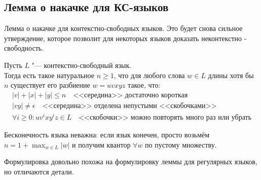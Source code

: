 
\subsection{Лемма о накачке для КС-языков}
Лемма о накачке для контекстно-свободных языков. Это будет снова сильное утверждение, которое позволит для некоторых языков
доказать неконтекстно - свободность.

\begin{lemma}
    Пусть $L$ "--- контекстно-свободный язык.\\
    Тогда есть такое натуральное $n \ge 1$, 
    что для любого слова $w \in L$ длины хотя бы $n$
    существует его разбиение $w=uvxyz$ такое, что:
    \begin{gather*}
        |v| + |x| + |y| \le n \quad \text{<<середина>> достаточно короткая}\\
        |vy| \neq \epsilon \quad \text{<<середина>> отделена непустыми <<скобочками>>}\\
        \forall i \ge 0 \colon uv^ixy^iz \in L \quad \text{<<скобочки>> можно повторять много раз или убрать}
    \end{gather*}
\end{lemma}
\begin{Rem}
    Бесконечность языка неважна: если язык конечен, просто возьмём $n=1+\max_{w\in L} |w|$
    и получим квантор $\forall w$ по пустому множеству.
\end{Rem}
\begin{Rem}
    Формулировка довольно похожа на формулировку леммы для регулярных языков, но отличаются детали.
\end{Rem}
